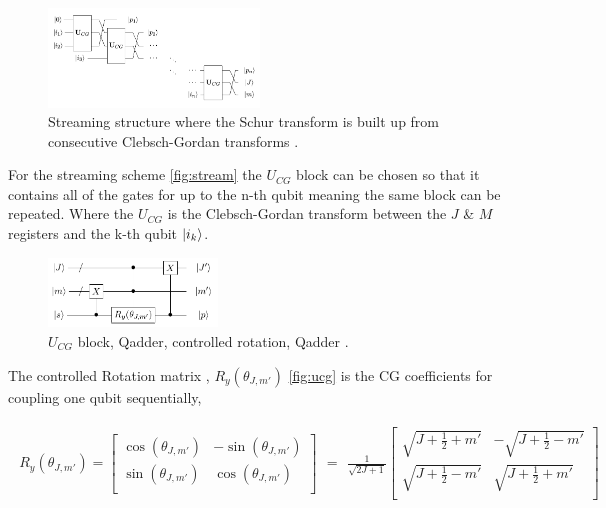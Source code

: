 \documentclass[12pt]{article}
\begin{document}
\begin{figure}[h!]
\centering
\includegraphics[width=0.5\textwidth]{schurcascade.png}
\caption{Streaming structure where the Schur transform is built up from consecutive Clebsch-Gordan transforms \cite{bacon2006efficient}.}
\label{fig:stream}
\end{figure}

For the streaming scheme \autoref{fig:stream} the $U_{CG}$ block can be chosen so that it contains all of the gates for up to the n-th qubit meaning the same block can be repeated. Where the $U_{CG}$ is the Clebsch-Gordan transform between the $J$ \& $M$ registers and the k-th qubit $\left\vert{i_k}\right\rangle$.

\begin{figure}[h!]
\centering
\includegraphics[width=0.4\textwidth]{genaddercirc.png}
\caption{$U_{CG}$ block, Qadder, controlled rotation, Qadder \cite{bacon2006efficient}.}
\label{fig:ucg}
\end{figure}

The controlled Rotation matrix \cite{bacon2006efficient}, $R_y(\theta_{J,m'})$ \autoref{fig:ucg} is the CG coefficients for coupling one qubit sequentially,

\begin{align}
\begin{split}
R_y(\theta_{J,m'})=
\begin{bmatrix}
\cos(\theta_{J,m'}) &-\sin(\theta_{J,m'}) \\
\sin(\theta_{J,m'}) & \cos(\theta_{J,m'}) \\
\end{bmatrix}
\end{split}
=
\begin{split}
\frac{1}{\sqrt{2J+1}}
\begin{bmatrix}
\sqrt{J+\frac{1}{2}+m'} &-\sqrt{J+\frac{1}{2}-m'} \\
\sqrt{J+\frac{1}{2}-m'} & \sqrt{J+\frac{1}{2}+m'} \\
\end{bmatrix}
\end{split}
\label{eq:rotmatrix}
\end{align}
\end{document}
